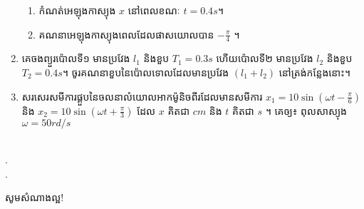 \documentclass{officialexam}
\begin{document}
\begin{enumerate}[m]
\begin{enumerate}[k]
			\item កំណត់អេឡុងកា​​​ស្យុង $x$ នៅពេលខណៈ $t=0.4s$។
			\item គណនាអេឡុងកា​​​ស្យុងពេលដែលផាសយោលបាន $-\frac{\pi}{4}$ ។
		\end{enumerate}
		\item គេចងព្យួរប៉ោលទី១ មានប្រវែង $l_1$ និងខួប $T_1=0.3s$ ហើយប៉ោលទី២ មានប្រវែង $l_2$ និងខួប $T_2=0.4s$។ ចូរគណនាខួបនៃប៉ោលទោលដែលមានប្រវែង $\left(l_1+l_2\right)$ នៅត្រង់កន្លែងនោះ។
		\item សរសេរសមីការផ្គួបនៃចលនាលំយោលអាកម៉ូនិចពីរដែលមានសមីការ $x_1=10\sin\left(\omega t -\frac{\pi}{6}\right)$ និង $x_2=10\sin\left(\omega t+ \frac{\pi}{3}\right)$ ដែល $x$ គិតជា $cm$ និង $t$ គិតជា $s$ ។ គេឲ្យ៖ ពុល​​សា​​ស្យុង$\omega = 50 rd/s$
	\end{enumerate}
	\\
	{\color{white}.}\dotfill\\
	{\color{white}.}\dotfill\\
	\begin{center}
		\sffamily\color{blue}
		សូមសំណាងល្អ!
	\end{center}\newpage
\end{document}
